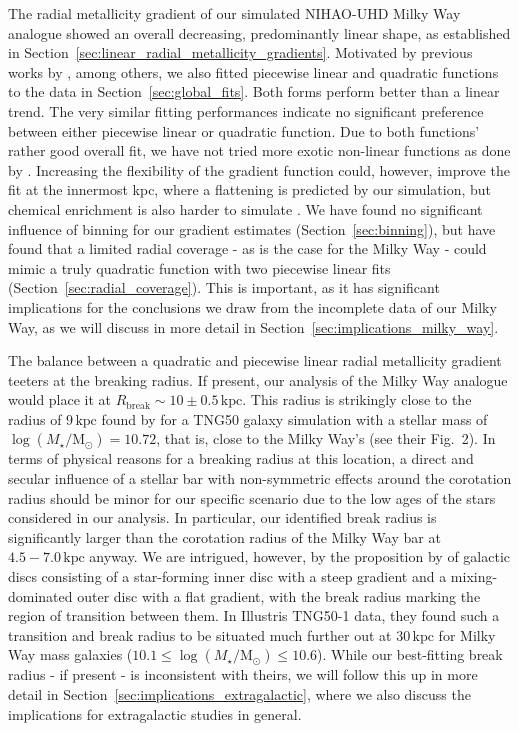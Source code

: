 \documentclass[twocolumn,apj,numberedappendix,appendixfloats,twocolappendix]{openjournal}
\begin{document}
\begin{CJK*}{UTF8}{gbsn}
The radial metallicity gradient of our simulated NIHAO-UHD Milky Way analogue showed an overall decreasing, predominantly linear shape, as established in Section~\ref{sec:linear_radial_metallicity_gradients}. Motivated by previous works by \citet{SanchezMenguiano2016}, among others, we also fitted piecewise linear and quadratic functions to the data in Section~\ref{sec:global_fits}. Both forms perform better than a linear trend. The very similar fitting performances indicate no significant preference between either piecewise linear or quadratic function. Due to both functions' rather good overall fit, we have not tried more exotic non-linear functions as done by \citet{Scarano2013}. Increasing the flexibility of the gradient function could, however, improve the fit at the innermost kpc, where a flattening is predicted by our simulation, but chemical enrichment is also harder to simulate \citep[see also][]{Minchev2013, Sun2024}. We have found no significant influence of binning for our gradient estimates (Section~\ref{sec:binning}), but have found that a limited radial coverage - as is the case for the Milky Way - could mimic a truly quadratic function with two piecewise linear fits (Section~\ref{sec:radial_coverage}). This is important, as it has significant implications for the conclusions we draw from the incomplete data of our Milky Way, as we will discuss in more detail in Section~\ref{sec:implications_milky_way}.

The balance between a quadratic and piecewise linear radial metallicity gradient teeters at the breaking radius. If present, our analysis of the Milky Way analogue would place it at $R_\mathrm{break} \sim 10 \pm 0.5\,\mathrm{kpc}$. This radius is strikingly close to the radius of $9\,\mathrm{kpc}$ found by \citet{Hemler2021} for a TNG50 galaxy simulation with a stellar mass of $\log(M_\star/\mathrm{M_\odot}) = 10.72$, that is, close to the Milky Way's (see their Fig.~2). In terms of physical reasons for a breaking radius at this location, a direct and secular influence of a stellar bar with non-symmetric effects around the corotation radius \citep{DiMatteo2013, Scarano2013} should be minor for our specific scenario due to the low ages of the stars considered in our analysis. In particular, our identified break radius is significantly larger than the corotation radius of the Milky Way bar at $4.5-7.0\,\mathrm{kpc}$ \citep[][and references therein]{BlandHawthorn_Gerhard2016} anyway. We are intrigued, however, by the proposition by \citet{Garcia2023} of galactic discs consisting of a star-forming inner disc with a steep gradient and a mixing-dominated outer disc with a flat gradient, with the break radius marking the region of transition between them. In Illustris TNG50-1 data, they found such a transition and break radius to be situated much further out at $30\,\mathrm{kpc}$ for Milky Way mass galaxies ($10.1 \leq \log(M_\star/\mathrm{M_\odot}) \leq 10.6$). While our best-fitting break radius - if present - is inconsistent with theirs, we will follow this up in more detail in Section~\ref{sec:implications_extragalactic}, where we also discuss the implications for extragalactic studies in general.


\end{CJK*}
\end{document}

